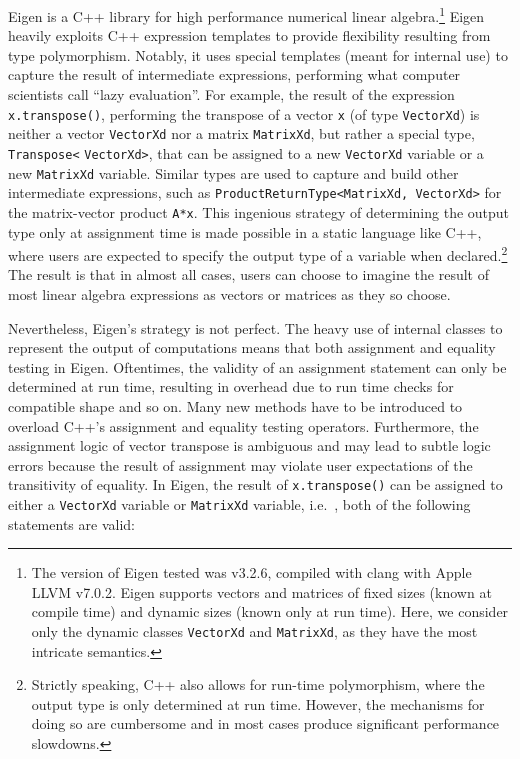 Eigen is a C++ library for high performance numerical linear algebra.\cite{eigenweb}\footnote{The version of Eigen tested was v3.2.6, compiled with clang with Apple LLVM v7.0.2.
Eigen supports vectors and matrices of fixed sizes (known at compile time) and dynamic sizes (known only at run time). Here, we consider only the dynamic classes \verb|VectorXd| and \verb|MatrixXd|, as they have the most intricate semantics.}
Eigen heavily exploits C++ expression templates to provide flexibility resulting from type polymorphism. Notably, it uses special templates (meant for internal use) to capture the result of intermediate expressions, performing what computer scientists call ``lazy evaluation''. For example, the result of the expression \verb|x.transpose()|, performing the transpose of a vector \verb|x| (of type \verb|VectorXd|) is neither a vector \verb|VectorXd| nor a matrix \verb|MatrixXd|, but rather a special type, \verb|Transpose<| \verb|VectorXd>|, that can be assigned to a new \verb|VectorXd| variable or a new \verb|MatrixXd| variable. Similar types are used to capture and build other intermediate expressions, such as \verb|ProductReturnType<MatrixXd, VectorXd>| for the matrix-vector product \verb|A*x|.
This ingenious strategy of determining the output type only at assignment time is made possible in a static language like C++, where users are expected to specify the output type of a variable when declared.\footnote{Strictly speaking, C++ also allows for run-time polymorphism, where the output type is only determined at run time. However, the mechanisms for doing so are cumbersome and in most cases produce significant performance slowdowns.} The result is that in almost all cases, users can choose to imagine the result of most linear algebra expressions as vectors or matrices as they so choose.

Nevertheless, Eigen's strategy is not perfect. The heavy use of internal classes to represent the output of computations means that both assignment and equality testing in Eigen. Oftentimes, the validity of an assignment statement can only be determined at run time, resulting in overhead due to run time checks for compatible shape and so on. Many new methods have to be introduced to overload C++'s assignment and equality testing operators. Furthermore, the assignment logic of vector transpose is ambiguous and may lead to subtle logic errors because the result of assignment may violate user expectations of the transitivity of equality. In Eigen, the result of \verb|x.transpose()| can be assigned to either a \verb|VectorXd| variable or \verb|MatrixXd| variable, i.e.\ , both of the following statements are valid:

